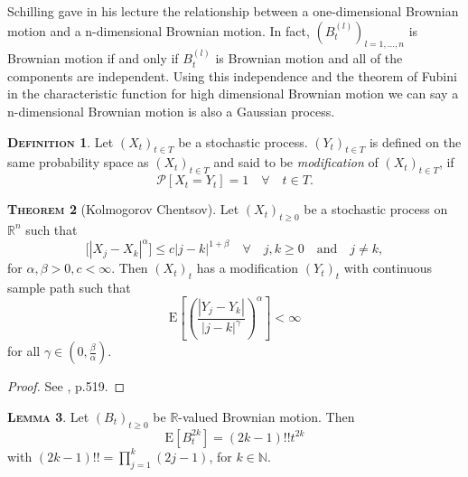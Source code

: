 \documentclass[a4paper, twoside, 11pt]{article}
\theoremstyle{definition}
\newtheorem{definition}{\scshape Definition}[section]
\newtheorem{theorem}[definition]{\scshape Theorem}
\newtheorem{lemma}[definition]{\scshape Lemma}
\begin{document}
  Schilling gave in his lecture \cite{shilling} the relationship between a one-dimensional Brownian motion and a n-dimensional Brownian motion.
  In fact, $(B_t^{(l)})_{l=1,\dots,n}$ is Brownian motion if and only if $B_t^{(l)}$ is Brownian motion and all of the components are independent. Using this independence and the theorem of Fubini in the characteristic function for high dimensional Brownian motion we can say a n-dimensional Brownian motion is also a Gaussian process.

  \begin{definition}
	Let $(X_t)_{t\in T}$  be a stochastic process. $(Y_t)_{t\in T}$ is defined on the same probability space as $(X_t)_{t\in T}$ and said to be \emph{modification} of $(X_t)_{t\in T}$, if
	\begin{equation*}
	  \mathcal{P}[X_t = Y_t] = 1 \hspace{1em} \forall \hspace{1em} t\in T.
	\end{equation*}
  \end{definition}

  \begin{theorem}[Kolmogorov Chentsov]
	 Let $(X_t)_{t \ge 0}$ be a stochastic process on $\mathbb{R}^{n}$ such that
	\begin{equation*}
	  \mathrm[|X_j - X_k|^\alpha] \le c |j - k|^{1+\beta} \hspace{1em}\forall \hspace{1em} j ,k \ge 0 \hspace{1em} \text{and} \hspace{1em} j\neq k,
	\end{equation*}
	for $\alpha, \beta > 0, c < \infty$. Then $(X_t)_t$ has a modification $(Y_t)_t$ with continuous sample path such that 
	\begin{equation*}
	  \mathrm{E}[(\frac{|Y_j - Y_k|}{|j - k|^\gamma})^\alpha] < \infty
	\end{equation*}
	for all $\gamma \in (0, \frac{\beta}{\alpha})$.
	\label{sec:kolch}
  \end{theorem}
  \begin{proof}
	See \cite{loeve}, p.519.
  \end{proof}

  \begin{lemma}
	Let $(B_t)_{t\ge 0}$ be $\mathbb{R}$-valued Brownian motion. Then
	 \begin{equation*}
	   \mathrm{E}[B_t^{2k}] = (2k - 1)!!t^{2k}
	 \end{equation*}
	 with $(2k - 1)!!=\prod_{j=1}^{k} (2j - 1)$, for $k \in \mathbb{N}$.
	 \label{sec:le1}
  \end{lemma}
\end{document}
